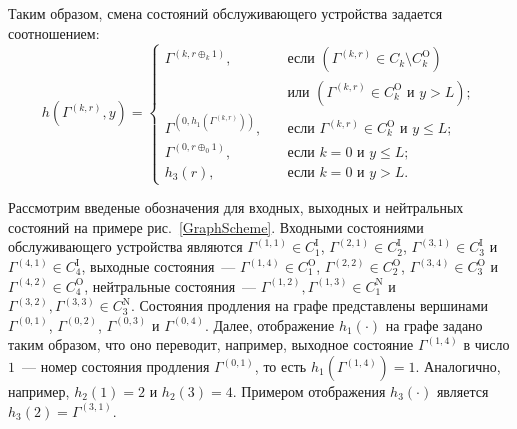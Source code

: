 Таким образом,  смена состояний обслуживающего устройства задается соотношением:
\begin{equation}
h(\Gamma^{(k, r)}, y) = 
\begin{cases}
\Gamma^{(k, r \oplus_k 1)}, & \quad \text{если } (\Gamma^{(k, r)}\in C_k\setminus C_k^{\mathrm{O}}) \\
& \quad \text{или } (\Gamma^{(k, r)}\in C_k^{\mathrm{O}} \text{ и } y>L);\\
\Gamma^{(0, h_1(\Gamma^{(k, r)}))}, & \quad \text{если } \Gamma^{(k, r)}\in C_k^{\mathrm{O}} \text{ и } y\leqslant L;\\
\Gamma^{(0, r \oplus_0 1)}, & \quad \text{если } k=0 \text{ и } y\leqslant L;\\
h_3(r), & \quad \text{если } k=0 \text{ и } y > L.
\end{cases}
\label{hLaw}
\end{equation}

Рассмотрим введеные обозначения для входных, выходных и нейтральных состояний на примере рис.~\ref{GraphScheme}. Входными состояниями обслуживающего устройства являются $\Gamma^{(1, 1)} \in C_1^{\mathrm{I}}$,  $\Gamma^{(2, 1)} \in C_2^{\mathrm{I}}$,  $\Gamma^{(3, 1)} \in C_3^{\mathrm{I}}$ и $\Gamma^{(4, 1)} \in C_4^{\mathrm{I}}$,  выходные состояния~--- $\Gamma^{(1, 4)} \in C_1^{\mathrm{O}}$,  $\Gamma^{(2, 2)} \in C_2^{\mathrm{O}}$,  $\Gamma^{(3, 4)} \in C_3^{\mathrm{O}}$ и $\Gamma^{(4, 2)} \in C_4^{\mathrm{O}}$,  нейтральные состояния~--- $\Gamma^{(1, 2)},  \Gamma^{(1, 3)} \in C_1^{\mathrm{N}}$ и $\Gamma^{(3, 2)},  \Gamma^{(3, 3)} \in C_3^{\mathrm{N}}$. Состояния продления на графе представлены вершинами $\Gamma^{(0, 1)}$,  $\Gamma^{(0, 2)}$,  $\Gamma^{(0, 3)}$ и $\Gamma^{(0, 4)}$. Далее,  отображение $h_1(\cdot)$ на графе задано таким образом,  что оно переводит,  например,  выходное состояние $\Gamma^{(1, 4)}$ в число $1$~--- номер состояния продления $\Gamma^{(0, 1)}$,  то есть $h_1(\Gamma^{(1, 4)})=1$. Аналогично,  например,  $h_2(1)=2$ и $h_2(3)=4$. Примером отображения $h_3(\cdot)$ является $h_3(2)=\Gamma^{(3, 1)}$.

